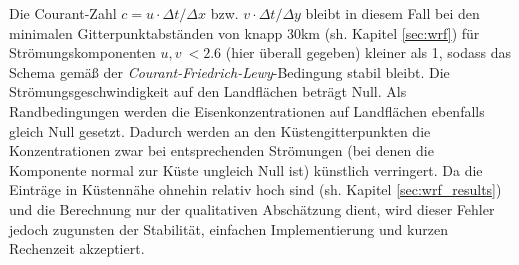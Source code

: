 \documentclass[12pt,a4paper,onecolumn,headheight=30pt]{scrartcl}
\begin{document}
Die Courant-Zahl $c = u \cdot \Delta t / \Delta x$ bzw. $v \cdot \Delta t / \Delta y$ bleibt in diesem Fall bei den minimalen Gitterpunktabständen von knapp 30km (sh. Kapitel \ref{sec:wrf}) für Strömungskomponenten $u,v \ < 2.6$ (hier überall gegeben) kleiner als 1, sodass das Schema gemäß der \textit{Courant-Friedrich-Lewy}-Bedingung stabil bleibt. Die Strömungsgeschwindigkeit auf den Landflächen beträgt Null. Als Randbedingungen werden die Eisenkonzentrationen auf Landflächen ebenfalls gleich Null gesetzt. Dadurch werden an den Küstengitterpunkten die Konzentrationen zwar bei entsprechenden Strömungen (bei denen die Komponente normal zur Küste ungleich Null ist) künstlich verringert. Da die Einträge in Küstennähe ohnehin relativ hoch sind (sh. Kapitel \ref{sec:wrf_results}) und die Berechnung nur der qualitativen Abschätzung dient, wird dieser Fehler jedoch zugunsten der Stabilität, einfachen Implementierung und kurzen Rechenzeit akzeptiert.
\end{document}
